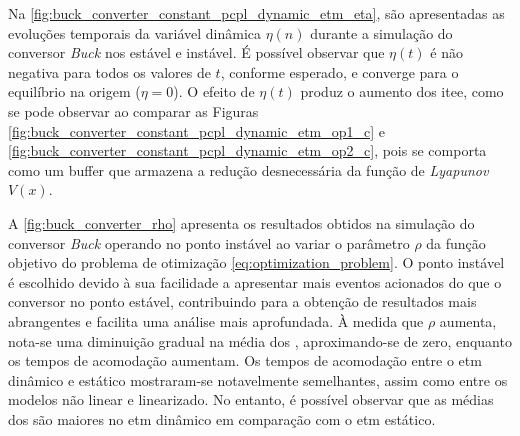 Na \autoref{fig:buck_converter_constant_pcpl_dynamic_etm_eta}, são apresentadas as evoluções temporais da variável dinâmica $\eta(n)$ durante a simulação do conversor \textit{Buck} nos  estável e instável. É possível observar que $\eta(t)$ é não negativa para todos os valores de $t$, conforme esperado, e converge para o equilíbrio na origem ($\eta = 0$). O efeito de $\eta(t)$ produz o aumento dos \acrshort{itee}, como se pode observar ao comparar as Figuras \ref{fig:buck_converter_constant_pcpl_dynamic_etm_op1_c} e \ref{fig:buck_converter_constant_pcpl_dynamic_etm_op2_c}, pois se comporta como um buffer que armazena a redução desnecessária da função de \textit{Lyapunov} $V(x)$.


A \autoref{fig:buck_converter_rho} apresenta os resultados obtidos na simulação do conversor \textit{Buck} operando no ponto instável ao variar o parâmetro $\rho$ da função objetivo do problema de otimização \eqref{eq:optimization_problem}. O ponto instável é escolhido devido à sua facilidade a apresentar mais eventos acionados do que o conversor no ponto estável, contribuindo para a obtenção de resultados mais abrangentes e facilita uma análise mais aprofundada. À medida que $\rho$ aumenta, nota-se uma diminuição gradual na média dos , aproximando-se de zero, enquanto os tempos de acomodação aumentam. Os tempos de acomodação entre o \acrshort{etm} dinâmico e estático mostraram-se notavelmente semelhantes, assim como entre os modelos não linear e linearizado. No entanto, é possível observar que as médias dos  são maiores no \acrshort{etm} dinâmico em comparação com o \acrshort{etm} estático.

